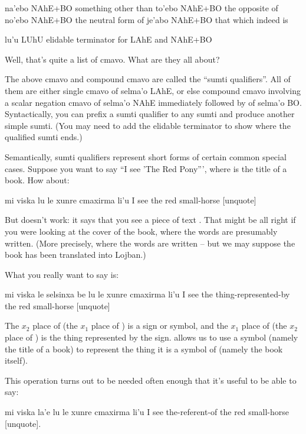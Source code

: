 na'ebo  NAhE+BO something other than
    to'ebo  NAhE+BO the opposite of
    no'ebo  NAhE+BO the neutral form of
    je'abo  NAhE+BO that which indeed is

lu'u    LUhU    elidable terminator for LAhE and NAhE+BO

Well, that's quite a list of cmavo. What are they all
    about?

The above cmavo and compound cmavo are called the ``sumti
    qualifiers''. All of them are either single cmavo of selma'o
    LAhE, or else compound cmavo involving a scalar negation cmavo
    of selma'o NAhE immediately followed by  of selma'o BO.
    Syntactically, you can prefix a sumti qualifier to any sumti
    and produce another simple sumti. (You may need to add the
    elidable terminator  to show where the qualified sumti
    ends.)

Semantically, sumti qualifiers represent short forms of
    certain common special cases. Suppose you want to say ``I see
    'The Red Pony''', where  is the title of a
    book. How about:
\begin{example}
mi viska lu le xunre cmaxirma li'u\n
I see  the red small-horse [unquote]
\end{example}

But  doesn't work: it says
    that you see a piece of text . That might be
    all right if you were looking at the cover of the book, where
    the words  are presumably written. (More
    precisely, where the words  are written --
    but we may suppose the book has been translated into
    Lojban.)

What you really want to say is:
\begin{example}
mi viska le selsinxa be\n
\T	lu le xunre cmaxirma li'u\n
I see the thing-represented-by\n
\T	{} the red small-horse [unquote]
\end{example}

The $x_2$ place of  (the $x_1$ place of ) is
    a sign or symbol, and the $x_1$ place of  (the $x_2$
    place of ) is the thing represented by the sign.  allows us to use a symbol
    (namely the title of a book) to represent the thing it is a
    symbol of (namely the book itself).

This operation turns out to be needed often enough that it's
    useful to be able to say:
\begin{example}
mi viska la'e lu le xunre cmaxirma li'u \n
I see the-referent-of\n
\T	[quote] the red small-horse [unquote].
\end{example}

